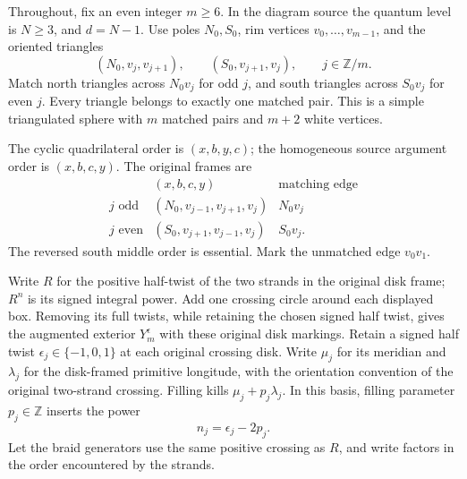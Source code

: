 \documentclass[11pt]{article}
\numberwithin{equation}{section}
\begin{document}
Throughout, fix an even integer \(m\ge6\). In the diagram source the
quantum level is \(N\ge3\), and \(d=N-1\). Use poles \(N_0,S_0\),
rim vertices \(v_0,\ldots,v_{m-1}\), and the
oriented triangles \begin{equation}\label{braid:eq-1}
(N_0,v_j,v_{j+1}),\qquad(S_0,v_{j+1},v_j),
 \qquad j\in\mathbb Z/m.
\end{equation} Match north triangles across \(N_0v_j\) for odd \(j\), and south
triangles across \(S_0v_j\) for even \(j\). Every triangle belongs to
exactly one matched pair. This is a simple triangulated sphere with
\(m\) matched pairs and \(m+2\) white vertices.

The cyclic quadrilateral order is \((x,b,y,c)\); the homogeneous source
argument order is \((x,b,c,y)\). The original frames are \begin{equation}\label{braid:eq-2}
\begin{array}{c|c|c}
 & (x,b,c,y)&\text{matching edge}\\ \hline
 j\text{ odd}&(N_0,v_{j-1},v_{j+1},v_j)&N_0v_j\\
 j\text{ even}&(S_0,v_{j+1},v_{j-1},v_j)&S_0v_j .
\end{array}
\end{equation} The reversed south middle order is essential. Mark the unmatched edge
\(v_0v_1\).

Write \(R\) for the positive half-twist of the two strands in the
original disk frame; \(R^n\) is its signed integral power. Add one
crossing circle around each displayed box. Removing its full twists,
while retaining the chosen signed half twist, gives the augmented
exterior \(Y_m^\epsilon\) with these original disk markings.
Retain a signed half twist \(\epsilon_j\in\{-1,0,1\}\) at each original
crossing disk. Write \(\mu_j\) for its meridian and \(\lambda_j\) for
the disk-framed primitive longitude, with the orientation convention of
the original two-strand crossing. Filling kills \(\mu_j+p_j\lambda_j\).
In this basis, filling parameter
\(p_j\in\mathbb Z\) inserts the power \begin{equation}\label{braid:eq-3}
n_j=\epsilon_j-2p_j.
\end{equation} Let the braid generators use the same positive crossing as \(R\), and
write factors in the order encountered by the strands.
\end{document}
